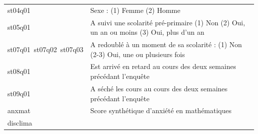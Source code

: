 \documentclass[12pt,twosided, notitlepage]{book}
\begin{document}
\begin{longtable}[]{@{}ll@{}}
\begin{minipage}[t]{0.38\columnwidth}\raggedright\strut
st04q01\strut
\end{minipage} & \begin{minipage}[t]{0.55\columnwidth}\raggedright\strut
Sexe : (1) Femme (2) Homme\strut
\end{minipage}\tabularnewline
\begin{minipage}[t]{0.38\columnwidth}\raggedright\strut
st05q01\strut
\end{minipage} & \begin{minipage}[t]{0.55\columnwidth}\raggedright\strut
A suivi une scolarité pré-primaire (1) Non (2) Oui, un an ou moins (3)
Oui, plus d'un an\strut
\end{minipage}\tabularnewline
\begin{minipage}[t]{0.38\columnwidth}\raggedright\strut
st07q01~st07q02~st07q03\strut
\end{minipage} & \begin{minipage}[t]{0.55\columnwidth}\raggedright\strut
A redoublé à un moment de sa scolarité : (1) Non (2-3) Oui, une ou
plusieurs fois\strut
\end{minipage}\tabularnewline
\begin{minipage}[t]{0.38\columnwidth}\raggedright\strut
st08q01\strut
\end{minipage} & \begin{minipage}[t]{0.55\columnwidth}\raggedright\strut
Est arrivé en retard au cours des deux semaines précédant
l'enquête\strut
\end{minipage}\tabularnewline
\begin{minipage}[t]{0.38\columnwidth}\raggedright\strut
st09q01\strut
\end{minipage} & \begin{minipage}[t]{0.55\columnwidth}\raggedright\strut
A séché les cours au cours des deux semaines précédant l'enquête\strut
\end{minipage}\tabularnewline
\begin{minipage}[t]{0.38\columnwidth}\raggedright\strut
anxmat\strut
\end{minipage} & \begin{minipage}[t]{0.55\columnwidth}\raggedright\strut
Score synthétique d'anxiété en mathématiques\strut
\end{minipage}\tabularnewline
\begin{minipage}[t]{0.38\columnwidth}\raggedright\strut
disclima\strut
\end{minipage} & \begin{minipage}[t]{0.55\columnwidth}\raggedright\strut

\end{minipage}
\end{longtable}
\end{document}
